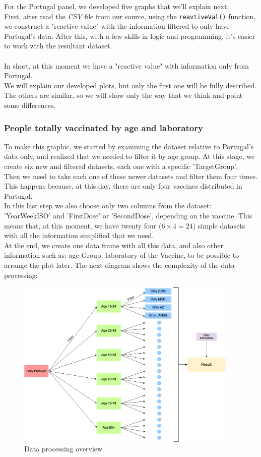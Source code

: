 For the Portugal panel, we developed five graphs that we'll explain next:\\
First, after read the \textit{CSV} file from our source, using the \texttt{reavtiveVal()} function, we construct a "reactive value" with the information filtered to only have Portugal's data. After this,  with a few skills in logic and programming, it's easier to work with the resultant dataset. \\
\\
In short, at this moment we have a "reactive value" with information only from Portugal.\\
We will explain our developed plots, but only the first one will be fully described. The others are similar, so we will show only the way that we think and point some differences.

\subsubsection{People totally vaccinated by age and laboratory}

To make this graphic, we started by examining the dataset relative to Portugal's data only, and realized that we needed to filter it by age group. At this stage, we create six new and filtered datasets, each one with a specific 'TargetGroup'. \\ 
Then we need to take each one of these newer datasets and filter them four times. This happens because, at this day, there are only four vaccines distributed in Portugal. \\ 
In this last step we also choose only two columns from the dataset: 'YearWeekISO' and 'FirstDose' or 'SecondDose', depending on the vaccine. This means that, at this moment, we have twenty four ($6 \times 4 = 24$) simple datasets with all the information simplified that we need. \\
At the end, we create one data frame with all this data, and also other information such as: age Group, laboratory of the Vaccine, to be possible to arrange the plot later.
The next diagram shows the complexity of the data processing:\\

\begin{figure}[h!]
\centering
\includegraphics[width=300pt,trim=10 0 0 -10mm]{images/coiso2.png}
\caption{Data processing overview}
\label{fig:overview2}
\end{figure}

